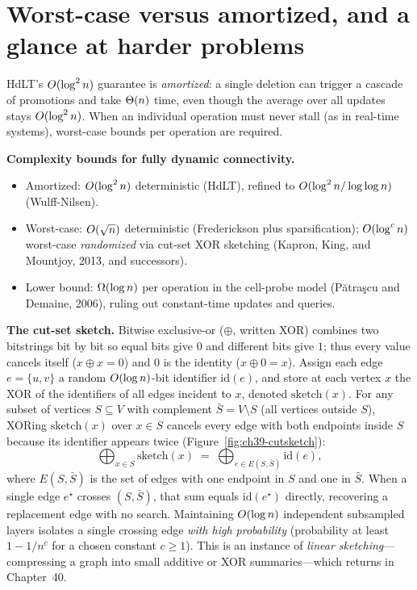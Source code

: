 \section{Worst-case versus amortized, and a glance at harder problems}
\label{ch39:worstcase}

HdLT's $O(\log^2 n)$ guarantee is \emph{amortized}: a single deletion can trigger a
cascade of promotions and take $\Theta(n)$ time, even though the average over all updates
stays $O(\log^2 n)$. When an individual operation must never stall (as in real-time
systems), worst-case bounds per operation are required.

\begin{focusbox}
\textbf{Complexity bounds for fully dynamic connectivity.}
\begin{itemize}
  \item Amortized: $O(\log^2 n)$ deterministic (HdLT), refined to
        $O(\log^2 n/\log\log n)$ (Wulff-Nilsen).
  \item Worst-case: $O(\sqrt n)$ deterministic (Frederickson plus sparsification);
        $O(\log^c n)$ worst-case \emph{randomized} via cut-set XOR sketching
        (Kapron, King, and Mountjoy, 2013, and successors).
  \item Lower bound: $\Omega(\log n)$ per operation in the cell-probe model
        (P\u{a}tra\c{s}cu and Demaine, 2006), ruling out constant-time updates and
        queries.
\end{itemize}
\end{focusbox}

\begin{aestheticbox}
\textbf{The cut-set sketch.} Bitwise exclusive-or ($\oplus$, written XOR) combines two
bitstrings bit by bit so equal bits give $0$ and different bits give $1$; thus every
value cancels itself ($x \oplus x = 0$) and $0$ is the identity ($x \oplus 0 = x$).
Assign each edge $e=\{u,v\}$ a random $O(\log n)$-bit identifier $\mathrm{id}(e)$,
and store at each vertex $x$ the XOR of the identifiers of all edges incident to $x$,
denoted $\mathrm{sketch}(x)$. For any subset of vertices $S \subseteq V$ with complement
$\bar S = V \setminus S$ (all vertices outside $S$), XORing $\mathrm{sketch}(x)$ over
$x \in S$ cancels every edge with both endpoints inside $S$ because its identifier
appears twice (Figure~\ref{fig:ch39-cutsketch}):
\[
  \bigoplus_{x \in S} \mathrm{sketch}(x)
  \;=\; \bigoplus_{e \in E(S,\bar S)} \mathrm{id}(e),
\]
where $E(S,\bar S)$ is the set of edges with one endpoint in $S$ and one in $\bar S$.
When a single edge $e^\star$ crosses $(S,\bar S)$, that sum equals $\mathrm{id}(e^\star)$
directly, recovering a replacement edge with no search. Maintaining $O(\log n)$
independent subsampled layers isolates a single crossing edge \emph{with high
probability} (probability at least $1 - 1/n^c$ for a chosen constant $c \ge 1$). This is
an instance of \emph{linear sketching}---compressing a graph into small additive or
XOR summaries---which returns in Chapter~40.
\end{aestheticbox}

